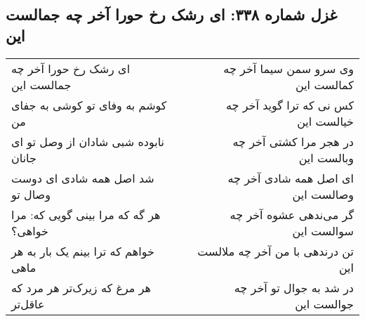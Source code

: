 \begin{center}
\section*{غزل شماره ۳۳۸: ای رشک رخ حورا آخر چه جمالست این}
\label{sec:338}
\begin{longtable}{l p{0.5cm} r}
ای رشک رخ حورا آخر چه جمالست این
&&
وی سرو سمن سیما آخر چه کمالست این
\\
کوشم به وفای تو کوشی به جفای من
&&
کس نی که ترا گوید آخر چه خیالست این
\\
نابوده شبی شادان از وصل تو ای جانان
&&
در هجر مرا کشتی آخر چه وبالست این
\\
شد اصل همه شادی ای دوست وصال تو
&&
ای اصل همه شادی آخر چه وصالست این
\\
هر گه که مرا بینی گویی که: مرا خواهی؟
&&
گر می‌ندهی عشوه آخر چه سوالست این
\\
خواهم که ترا بینم یک بار به هر ماهی
&&
تن درندهی با من آخر چه ملالست این
\\
هر مرغ که زیرک‌تر هر مرد که عاقل‌تر
&&
در شد به جوال تو آخر چه جوالست این
\\
\end{longtable}
\end{center}
